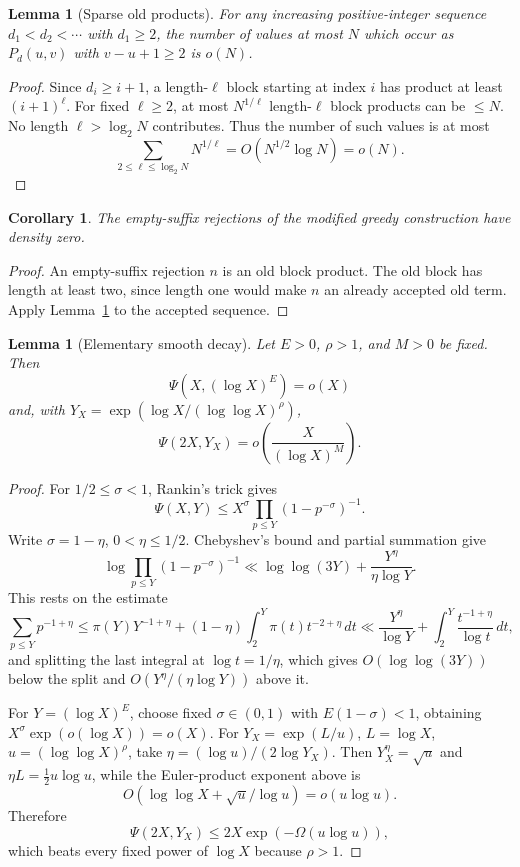 \documentclass[11pt]{article}
\newtheorem{lemma}[theorem]{Lemma}
\newtheorem{corollary}[theorem]{Corollary}
\theoremstyle{definition}
\newcommand{\1}{\mathbf 1}
\begin{document}
\begin{lemma}[Sparse old products]\label{lem:block-products-sparse}
For any increasing positive-integer sequence \(d_1<d_2<\cdots\) with
\(d_1\ge2\), the number of values at most \(N\) which occur as
\(P_d(u,v)\) with \(v-u+1\ge2\) is \(o(N)\).
\end{lemma}

\begin{proof}
Since \(d_i\ge i+1\), a length-\(\ell\) block starting at index \(i\) has
product at least \((i+1)^\ell\).  For fixed \(\ell\ge2\), at most
\(N^{1/\ell}\) length-\(\ell\) block products can be \(\le N\).  No length
\(\ell>\log_2 N\) contributes.  Thus the number of such values is at most
\[
  \sum_{2\le \ell\le \log_2 N} N^{1/\ell}
  =O(N^{1/2}\log N)=o(N).
\]
\end{proof}

\begin{corollary}\label{cor:empty-suffix}
The empty-suffix rejections of the modified greedy construction have density
zero.
\end{corollary}

\begin{proof}
An empty-suffix rejection \(n\) is an old block product.  The old block has
length at least two, since length one would make \(n\) an already accepted
old term.  Apply Lemma~\ref{lem:block-products-sparse} to the accepted
sequence.
\end{proof}

\begin{lemma}[Elementary smooth decay]\label{lem:smooth-decay}
Let \(E>0\), \(\rho>1\), and \(M>0\) be fixed.  Then
\[
  \Psi(X,(\log X)^E)=o(X)
\]
and, with \(Y_X=\exp(\log X/(\log\log X)^\rho)\),
\[
  \Psi(2X,Y_X)=o\!\left(\frac{X}{(\log X)^M}\right).
\]
\end{lemma}

\begin{proof}
For \(1/2\le\sigma<1\), Rankin's trick gives
\[
  \Psi(X,Y)\le X^\sigma\prod_{p\le Y}(1-p^{-\sigma})^{-1}.
\]
Write \(\sigma=1-\eta\), \(0<\eta\le1/2\).  Chebyshev's bound and partial
summation give
\[
\log\prod_{p\le Y}(1-p^{-\sigma})^{-1}
 \ll \log\log(3Y)+\frac{Y^\eta}{\eta\log Y}.
\]
This rests on the estimate
\[
\sum_{p\le Y}p^{-1+\eta}
\le \pi(Y)Y^{-1+\eta}
 +(1-\eta)\int_2^Y \pi(t)t^{-2+\eta}\,dt
\ll \frac{Y^\eta}{\log Y}
 + \int_2^Y \frac{t^{-1+\eta}}{\log t}\,dt,
\]
and splitting the last integral at \(\log t=1/\eta\), which gives
\(O(\log\log(3Y))\) below the split and \(O(Y^\eta/(\eta\log Y))\) above it.

For \(Y=(\log X)^E\), choose fixed \(\sigma\in(0,1)\) with
\(E(1-\sigma)<1\), obtaining \(X^\sigma\exp(o(\log X))=o(X)\).
For \(Y_X=\exp(L/u)\), \(L=\log X\), \(u=(\log\log X)^\rho\), take
\(\eta=(\log u)/(2\log Y_X)\).  Then \(Y_X^\eta=\sqrt u\) and
\(\eta L=\tfrac12 u\log u\), while the Euler-product exponent above is
\[
  O(\log\log X+\sqrt u/\log u)=o(u\log u).
\]
Therefore
\[
  \Psi(2X,Y_X)\le 2X\exp(-\Omega(u\log u)),
\]
which beats every fixed power of \(\log X\) because \(\rho>1\).
\end{proof}
\end{document}
